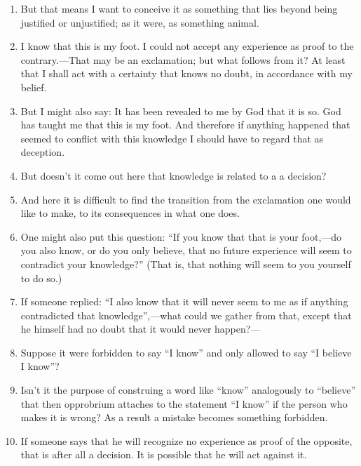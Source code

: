 \documentclass{book}
\begin{document}
\begin{enumerate}
\item
But that means I want to conceive it as something that lies beyond being
justified or unjustified; as it were, as something animal.

\item
I know that this is my foot. I could not accept any experience as proof to the
contrary.---That may be an exclamation; but what follows from it? At least that
I shall act with a certainty that knows no doubt, in accordance with my belief.

\item
But I might also say: It has been revealed to me by God that it is so. God has
taught me that this is my foot. And therefore if anything happened that seemed
to conflict with this knowledge I should have to regard that as deception.

\item
But doesn't it come out here that knowledge is related to a a decision?

\item
And here it is difficult to find the transition from the exclamation one would
like to make, to its consequences in what one does.

\item
One might also put this question: ``If you know that that is your foot,---do
you also know, or do you only believe, that no future experience will seem to
contradict your knowledge?'' (That is, that nothing will seem to you yourself
to do so.)

\item
If someone replied: ``I also know that it will never seem to me as if anything
contradicted that knowledge'',---what could we gather from that, except that he
himself had no doubt that it would never happen?---

\item
Suppose it were forbidden to say ``I know'' and only allowed to say ``I believe
I know''?

\item
Isn't it the purpose of construing a word like ``know'' analogously to
``believe'' that then opprobrium attaches to the statement ``I know'' if the
person who makes it is wrong?  As a result a mistake becomes something
forbidden.

\item
If someone says that he will recognize no experience as proof of the opposite,
that is after all a decision. It is possible that he will act against it.


\end{enumerate}
\end{document}
